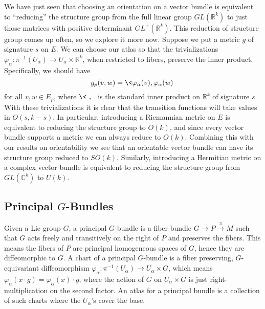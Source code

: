 We have just seen that choosing an orientation on a vector bundle is equivalent to ``reducing'' the structure group from the full linear group $GL(\mathbb R^k)$ to just those matrices with positive determinant $GL^+(\mathbb R^k)$. This reduction of structure group comes up often, so we explore it more now. Suppose we put a metric $g$ of signature $s$ on $E$. We can choose our atlas so that the trivializations $\varphi_\alpha : \pi^{-1}(U_\alpha) \rightarrow U_\alpha \times \mathbb R^k$, when restricted to fibers, preserve the inner product. Specifically, we should have
\[ g_p(v,w) = \< \varphi_\alpha(v),\varphi_\alpha(w) \> \]
for all $v,w \in E_p$, where $\<\ ,\ \>$ is the standard inner product on $\mathbb R^k$ of signature $s$. With these trivializations it is clear that the transition functions will take values in $O(s,k-s)$. In particular, introducing a Riemannian metric on $E$ is equivalent to reducing the structure group to $O(k)$, and since every vector bundle supports a metric we can always reduce to $O(k)$. Combining this with our results on orientability we see that an orientable vector bundle can have its structure group reduced to $SO(k)$. Similarly, introducing a Hermitian metric on a complex vector bundle is equivalent to reducing the structure group from $GL(\mathbb C^k)$ to $U(k)$. 





\subsection{Principal $G$-Bundles}



Given a Lie group $G$, a principal $G$-bundle is a fiber bundle $G \rightarrow P \stackrel{\pi}{\rightarrow} M$ such that $G$ acts freely and transitively on the right of $P$ and preserves the fibers. This means the fibers of $P$ are principal homogeneous spaces of $G$, hence they are diffeomorphic to $G$. A chart of a principal $G$-bundle is a fiber preserving, $G$-equivariant diffeomorphism $\varphi_\alpha : \pi^{-1}(U_\alpha) \rightarrow U_\alpha \times G$, which means $\varphi_\alpha(x \cdot g) = \varphi_\alpha(x) \cdot g$, where the action of $G$ on $U_\alpha \times G$ is just right-multiplication on the second factor. An atlas for a principal bundle is a collection of such charts where the $U_\alpha$'s cover the base. 

